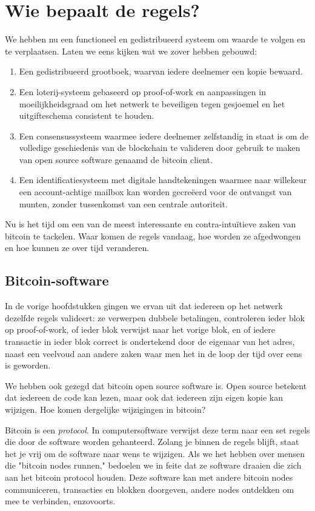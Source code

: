 \chapter{Wie bepaalt de regels?}

We hebben nu een functioneel en gedistribueerd systeem om waarde te volgen en te verplaatsen. Laten we eens kijken wat we zover hebben gebouwd:

\begin{enumerate}
    \item Een gedistribueerd grootboek, waarvan iedere deelnemer een kopie bewaard.
    \item Een loterij-systeem gebaseerd op proof-of-work en aanpassingen in moeilijkheidsgraad om het netwerk te beveiligen tegen gesjoemel en het uitgifteschema consistent te houden.
    \item Een consensussysteem waarmee iedere deelnemer zelfstandig in staat is om de volledige geschiedenis van de blockchain te valideren door gebruik te maken van open source software genaamd de bitcoin client. 
    \item Een identificatiesysteem met digitale handtekeningen waarmee naar willekeur een account-achtige mailbox kan worden gecreëerd voor de ontvangst van munten, zonder tussenkomst van een centrale autoriteit.
\end{enumerate}

Nu is het tijd om een van de meest interessante en contra-intuïtieve zaken van bitcoin te tackelen. Waar komen de regels vandaag, hoe worden ze afgedwongen en hoe kunnen ze over tijd veranderen. 

\section{Bitcoin-software}

In de vorige hoofdstukken gingen we ervan uit dat iedereen op het netwerk dezelfde regels valideert: ze verwerpen dubbele betalingen, controleren ieder blok op proof-of-work, of ieder blok verwijst naar het vorige blok, en of iedere transactie in ieder blok correct is ondertekend door de eigenaar van het adres, naast een veelvoud aan andere zaken waar men het in de loop der tijd over eens is geworden. 

We hebben ook gezegd dat bitcoin open source software is. Open source betekent dat iedereen de code kan lezen, maar ook dat iedereen zijn eigen kopie kan wijzigen. Hoe komen dergelijke wijzigingen in bitcoin?

Bitcoin is een \textit{protocol}. In computersoftware verwijst deze term naar een set regels die door de software worden gehanteerd. Zolang je binnen de regels blijft, staat het je vrij om de software naar wens te wijzigen. Als we het hebben over mensen die "bitcoin nodes runnen," bedoelen we in feite dat ze software draaien die zich aan het bitcoin protocol houden. Deze software kan met andere bitcoin nodes communiceren, transacties en blokken doorgeven, andere nodes ontdekken om mee te verbinden, enzovoorts.   

